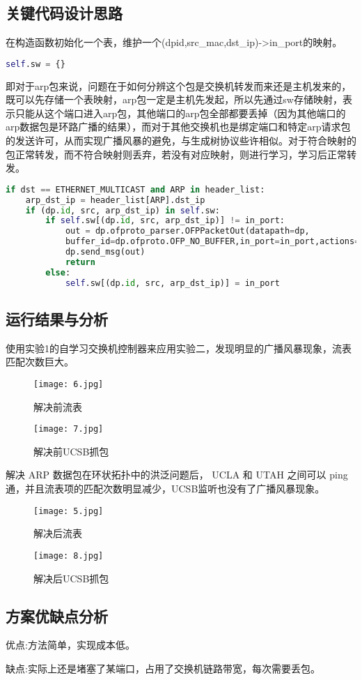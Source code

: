 \documentclass{xjtureport}
\begin{document}
\subsection{关键代码设计思路}
在构造函数初始化一个表，维护一个(dpid,src\_mac,dst\_ip)->in\_port的映射。
\begin{lstlisting}[language=Python]
	self.sw = {}
\end{lstlisting}
\quad \quad 即对于arp包来说，问题在于如何分辨这个包是交换机转发而来还是主机发来的，既可以先存储一个表映射，arp包一定是主机先发起，所以先通过sw存储映射，表示只能从这个端口进入arp包，其他端口的arp包全部都要丢掉（因为其他端口的arp数据包是环路广播的结果），而对于其他交换机也是绑定端口和特定arp请求包的发送许可，从而实现广播风暴的避免，与生成树协议些许相似。对于符合映射的包正常转发，而不符合映射则丢弃，若没有对应映射，则进行学习，学习后正常转发。
\begin{lstlisting}[language=Python]	
if dst == ETHERNET_MULTICAST and ARP in header_list:
	arp_dst_ip = header_list[ARP].dst_ip
	if (dp.id, src, arp_dst_ip) in self.sw:
		if self.sw[(dp.id, src, arp_dst_ip)] != in_port:
			out = dp.ofproto_parser.OFPPacketOut(datapath=dp,
			buffer_id=dp.ofproto.OFP_NO_BUFFER,in_port=in_port,actions=[], data=None)
			dp.send_msg(out)
			return
		else:
			self.sw[(dp.id, src, arp_dst_ip)] = in_port
\end{lstlisting}
\subsection{运行结果与分析}
使用实验1的自学习交换机控制器来应用实验二，发现明显的广播风暴现象，流表匹配次数巨大。
\begin{figure}[H]
	\centering
	\texttt{[image: 6.jpg]}
	\caption{解决前流表}
\end{figure}
\begin{figure}[H]
	\centering
	\texttt{[image: 7.jpg]}
	\caption{解决前UCSB抓包}
\end{figure}
解决 ARP 数据包在环状拓扑中的洪泛问题后， UCLA 和 UTAH 之间可以 ping 通，并且流表项的匹配次数明显减少，UCSB监听也没有了广播风暴现象。
\begin{figure}[H]
	\centering
	\texttt{[image: 5.jpg]}
	\caption{解决后流表}
\end{figure}
\begin{figure}[H]
	\centering
	\texttt{[image: 8.jpg]}
	\caption{解决后UCSB抓包}
\end{figure}
\subsection{方案优缺点分析}
优点:方法简单，实现成本低。\par 
缺点:实际上还是堵塞了某端口，占用了交换机链路带宽，每次需要丢包。\par
\end{document}
